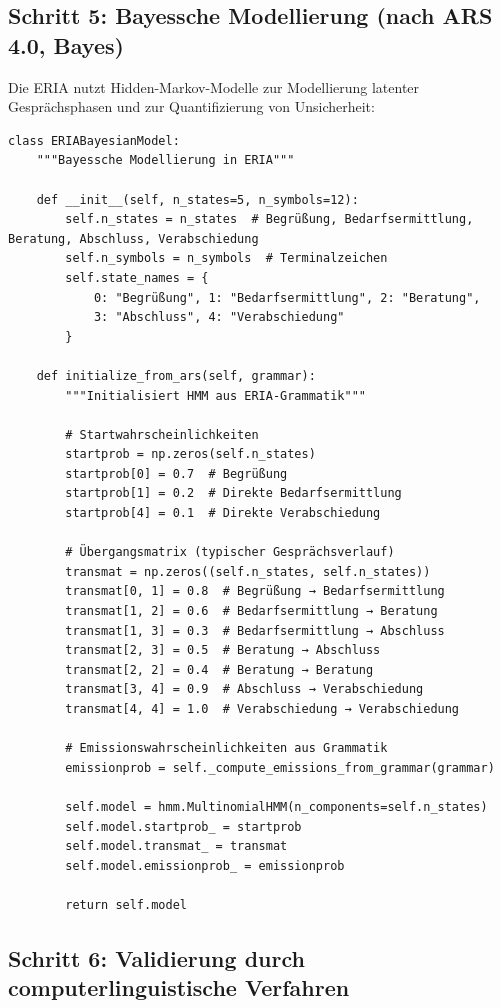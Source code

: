 \documentclass[12pt,a4paper]{article}
\begin{document}
\subsection{Schritt 5: Bayessche Modellierung (nach ARS 4.0, Bayes)}

Die ERIA nutzt Hidden-Markov-Modelle zur Modellierung latenter Gesprächsphasen 
und zur Quantifizierung von Unsicherheit:

\begin{lstlisting}[caption=HMM für ERIA]
class ERIABayesianModel:
    """Bayessche Modellierung in ERIA"""
    
    def __init__(self, n_states=5, n_symbols=12):
        self.n_states = n_states  # Begrüßung, Bedarfsermittlung, Beratung, Abschluss, Verabschiedung
        self.n_symbols = n_symbols  # Terminalzeichen
        self.state_names = {
            0: "Begrüßung", 1: "Bedarfsermittlung", 2: "Beratung",
            3: "Abschluss", 4: "Verabschiedung"
        }
    
    def initialize_from_ars(self, grammar):
        """Initialisiert HMM aus ERIA-Grammatik"""
        
        # Startwahrscheinlichkeiten
        startprob = np.zeros(self.n_states)
        startprob[0] = 0.7  # Begrüßung
        startprob[1] = 0.2  # Direkte Bedarfsermittlung
        startprob[4] = 0.1  # Direkte Verabschiedung
        
        # Übergangsmatrix (typischer Gesprächsverlauf)
        transmat = np.zeros((self.n_states, self.n_states))
        transmat[0, 1] = 0.8  # Begrüßung → Bedarfsermittlung
        transmat[1, 2] = 0.6  # Bedarfsermittlung → Beratung
        transmat[1, 3] = 0.3  # Bedarfsermittlung → Abschluss
        transmat[2, 3] = 0.5  # Beratung → Abschluss
        transmat[2, 2] = 0.4  # Beratung → Beratung
        transmat[3, 4] = 0.9  # Abschluss → Verabschiedung
        transmat[4, 4] = 1.0  # Verabschiedung → Verabschiedung
        
        # Emissionswahrscheinlichkeiten aus Grammatik
        emissionprob = self._compute_emissions_from_grammar(grammar)
        
        self.model = hmm.MultinomialHMM(n_components=self.n_states)
        self.model.startprob_ = startprob
        self.model.transmat_ = transmat
        self.model.emissionprob_ = emissionprob
        
        return self.model
\end{lstlisting}

\subsection{Schritt 6: Validierung durch computerlinguistische Verfahren}
\end{document}
